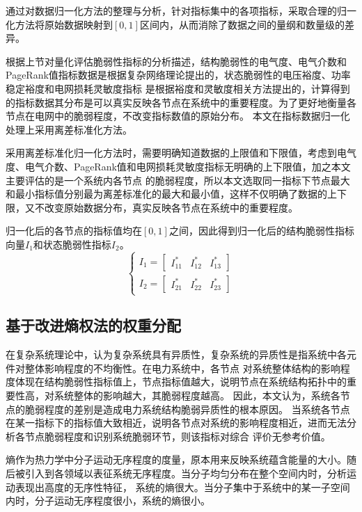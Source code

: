 通过对数据归一化方法的整理与分析，针对指标集中的各项指标，采取合理的归一化方法将原始数据映射到$\left[0,1\right]$区间内，从而消除了数据之间的量纲和数量级的差异。

根据上节对量化评估脆弱性指标的分析描述，结构脆弱性的电气度、电气介数和PageRank值指标数据是根据复杂网络理论提出的，状态脆弱性的电压裕度、功率稳定裕度和电网损耗灵敏度指标
是根据裕度和灵敏度相关方法提出的，计算得到的指标数据其分布是可以真实反映各节点在系统中的重要程度。为了更好地衡量各节点在电网中的脆弱程度，不改变指标数值的原始分布。
本文在指标数据归一化处理上采用离差标准化方法。

采用离差标准化归一化方法时，需要明确知道数据的上限值和下限值，考虑到电气度、电气介数、PageRank值和电网损耗灵敏度指标无明确的上下限值，加之本文主要评估的是一个系统内各节点
的脆弱程度，所以本文选取同一指标下节点最大和最小指标值分别最为离差标准化的最大和最小值，这样不仅明确了数据的上下限，又不改变原始数据分布，真实反映各节点在系统中的重要程度。

归一化后的各节点的指标值均在$\left[0,1\right]$之间，因此得到归一化后的结构脆弱性指标向量$I_1$和状态脆弱性指标$I_2$。
\begin{equation}
  \left\{\begin{array}{l}{I_{1}=\left[\begin{array}{lll}{I_{11}^{*}} & {I_{12}^{*}} & {I_{13}^{*}}\end{array}\right]} \\
   {I_{2}=\left[\begin{array}{lll}{I_{21}^{*}} & {I_{22}^{*}} & {I_{23}^{*}}\end{array}\right]}\end{array}\right.
  \end{equation}


\subsection{基于改进熵权法的权重分配}
\label{sec:nomalz}
在复杂系统理论中，认为复杂系统具有异质性，复杂系统的异质性是指系统中各元件对整体影响程度的不均衡性。在电力系统中，各节点
对系统整体结构的影响程度体现在结构脆弱性指标值上，节点指标值越大，说明节点在系统结构拓扑中的重要性高，对系统整体的影响越大，其脆弱程度越高。
因此，本文认为，系统各节点的脆弱程度的差别是造成电力系统结构脆弱异质性的根本原因。
当系统各节点在某一指标下的指标值大致相近，说明各节点对系统的影响程度相近，进而无法分析各节点脆弱程度和识别系统脆弱环节，则该指标对综合
评价无参考价值。

熵作为热力学中分子运动无序程度的度量，原本用来反映系统蕴含能量的大小。随后被引入到各领域以表征系统无序程度。当分子均匀分布在整个空间内时，分析运动表现出高度的无序性特征，
系统的熵很大。当分子集中于系统中的某一子空间内时，分子运动无序程度很小，系统的熵很小\cite{refs76}。

